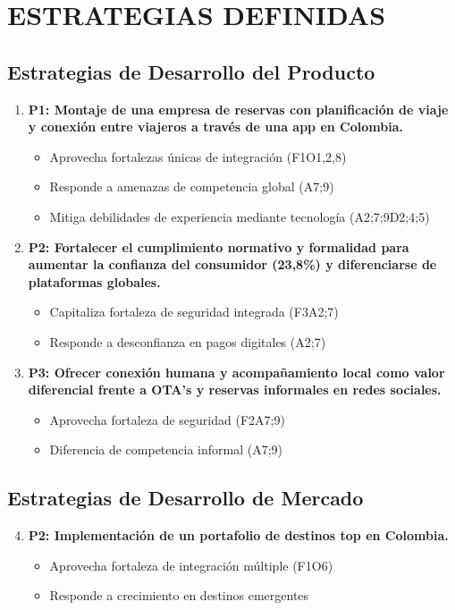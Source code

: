 \documentclass[12pt,a4paper]{article}
\newcommand{\sectiontitle}[1]{\section{#1}}
\newcommand{\subsectiontitle}[1]{\subsection{#1}}
\begin{document}
\sectiontitle{ESTRATEGIAS DEFINIDAS}

\subsectiontitle{Estrategias de Desarrollo del Producto}

\begin{enumerate}
    \item \textbf{P1: Montaje de una empresa de reservas con planificación de viaje y conexión entre viajeros a través de una app en Colombia.}
    \begin{itemize}
        \item Aprovecha fortalezas únicas de integración (F1O1,2,8)
        \item Responde a amenazas de competencia global (A7;9)
        \item Mitiga debilidades de experiencia mediante tecnología (A2;7;9D2;4;5)
    \end{itemize}
    
    \item \textbf{P2: Fortalecer el cumplimiento normativo y formalidad para aumentar la confianza del consumidor (23,8\%) y diferenciarse de plataformas globales.}
    \begin{itemize}
        \item Capitaliza fortaleza de seguridad integrada (F3A2;7)
        \item Responde a desconfianza en pagos digitales (A2;7)
    \end{itemize}
    
    \item \textbf{P3: Ofrecer conexión humana y acompañamiento local como valor diferencial frente a OTA's y reservas informales en redes sociales.}
    \begin{itemize}
        \item Aprovecha fortaleza de seguridad (F2A7;9)
        \item Diferencia de competencia informal (A7;9)
    \end{itemize}
\end{enumerate}

\subsectiontitle{Estrategias de Desarrollo de Mercado}

\begin{enumerate}
    \setcounter{enumi}{3}
    \item \textbf{P2: Implementación de un portafolio de destinos top en Colombia.}
    \begin{itemize}
        \item Aprovecha fortaleza de integración múltiple (F1O6)
        \item Responde a crecimiento en destinos emergentes
    \end{itemize}
\end{enumerate}
\end{document}
